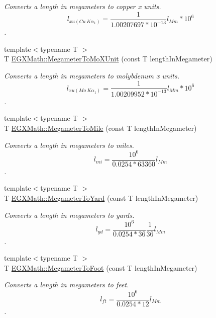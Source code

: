 \begin{DoxyCompactItemize}
\begin{DoxyCompactList}\small\item\em Converts a length in megameters to copper x units. \[ l_{xu(Cu\ K\alpha_1)}= \frac{1}{1.00207697*10^{-13}} l_{Mm} * 10^{6}\]. \end{DoxyCompactList}\item 
{\footnotesize template$<$typename T $>$ }\\T \mbox{\hyperlink{group___e_g_x_math-_conversions-_length_conversions-_s_i-_megameter-_non-_s_i_ga134a9fb2603b93c739c4ee58864f69c6}{E\+G\+X\+Math\+::\+Megameter\+To\+Mo\+X\+Unit}} (const T length\+In\+Megameter)
\begin{DoxyCompactList}\small\item\em Converts a length in megameters to molybdenum x units. \[ l_{xu(Mo\ K\alpha_1)}=\frac{1}{1.00209952*10^{-13}} l_{Mm} * 10^{6}\]. \end{DoxyCompactList}\item 
{\footnotesize template$<$typename T $>$ }\\T \mbox{\hyperlink{group___e_g_x_math-_conversions-_length_conversions-_s_i-_megameter-_imperial_gaa20a079fd7502961010c93e0091ab17c}{E\+G\+X\+Math\+::\+Megameter\+To\+Mile}} (const T length\+In\+Megameter)
\begin{DoxyCompactList}\small\item\em Converts a length in megameters to miles. \[ l_{mi}=\frac{10^{6}}{0.0254 * 63360} l_{Mm} \]. \end{DoxyCompactList}\item 
{\footnotesize template$<$typename T $>$ }\\T \mbox{\hyperlink{group___e_g_x_math-_conversions-_length_conversions-_s_i-_megameter-_imperial_gae8b77cb5d4f8cf566968e18dde870c74}{E\+G\+X\+Math\+::\+Megameter\+To\+Yard}} (const T length\+In\+Megameter)
\begin{DoxyCompactList}\small\item\em Converts a length in megameters to yards. \[ l_{yd}= \frac{10^{6}}{0.0254 * 36} \frac{1}{36} l_{Mm} \]. \end{DoxyCompactList}\item 
{\footnotesize template$<$typename T $>$ }\\T \mbox{\hyperlink{group___e_g_x_math-_conversions-_length_conversions-_s_i-_megameter-_imperial_ga5586abd81d8635465b9be7f9be5fadc7}{E\+G\+X\+Math\+::\+Megameter\+To\+Foot}} (const T length\+In\+Megameter)
\begin{DoxyCompactList}\small\item\em Converts a length in megameters to feet. \[ l_{ft}= \frac{10^{6}}{0.0254 * 12} l_{Mm} \]. \end{DoxyCompactList}\item 

\end{DoxyCompactItemize}
